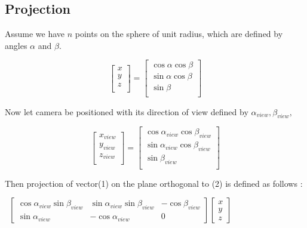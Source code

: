 \documentclass[]{article}
\begin{document}
\subsection{Projection}
Assume we have $n$ points on the sphere of unit radius, which are defined by angles $\alpha$ and $\beta.$

\begin{equation}
\left[ \begin{array}{c}
x \\ y \\ z \\ \end{array}\right]
=
\left[ \begin{array}{c}
\cos \alpha \cos \beta \\ 
\sin \alpha \cos \beta \\ 
\sin \beta \\ \end{array}\right]
\end{equation} \label{eq1}

Now let camera be positioned with its direction of view defined by $\alpha_{view},\beta_{view},$

\begin{equation}
\left[\begin{array}{c}
x_{view} \\ y_{view} \\ z_{view} \\ \end{array}\right]
=
\left[ \begin{array}{c}
\cos \alpha_{view} \cos \beta_{view} \\ 
\sin \alpha_{view} \cos \beta_{view} \\ 
\sin \beta_{view} \\ \end{array}\right]
\end{equation} \label{eq2}

Then projection of vector(1) on the plane orthogonal to (2) is defined as follows : 
	
\[
\left[ 
\begin{array}{ccc}
\cos \alpha_{view} \sin \beta_{view}  & \sin \alpha_{view} \sin \beta_{view}  & -\cos \beta_{view}  \\ 
\sin \alpha_{view}  & -\cos \alpha_{view}  & 0%
\end{array}%
\right] \left[ 
\begin{array}{c}
x \\ 
y \\ 
z%
\end{array}%
\right]\hspace{100pt}\]
\end{document}
